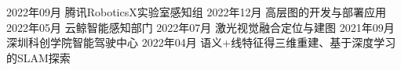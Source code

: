 %
%


 
\begin{experiences}
			
 \experience
    {2022年09月}   {}{腾讯}{RoboticsX实验室感知组}
    {2022年12月} {高层图的开发与部署应用}{}
  \experience
  {2022年05月}   {}{云鲸智能}{感知部门}
  {2022年07月} {激光视觉融合定位与建图}{}
  \experience
  {2021年09月}   {}{深圳科创学院}{智能驾驶中心}
  {2022年04月} {语义+线特征得三维重建、基于深度学习的SLAM探索}{}
		
\end{experiences}
